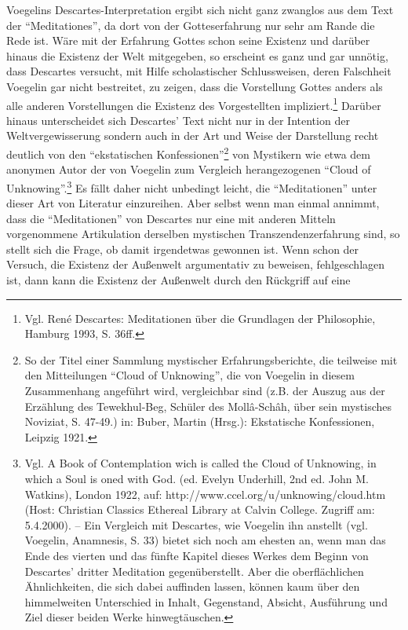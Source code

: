 Voegelins Descartes-Interpretation ergibt sich nicht ganz zwanglos aus dem
Text der "`Meditationes"', da dort von der Gotteserfahrung nur sehr am Rande
die Rede ist. Wäre mit der Erfahrung Gottes schon seine Existenz und darüber
hinaus die Existenz der Welt mitgegeben, so erscheint es ganz und gar unnötig,
dass Descartes versucht, mit Hilfe scholastischer Schlussweisen, deren
Falschheit Voegelin gar nicht bestreitet, zu zeigen, dass die Vorstellung
Gottes anders als alle anderen Vorstellungen die Existenz des Vorgestellten
impliziert.\footnote{Vgl. René Descartes: Meditationen über die Grundlagen der
  Philosophie, Hamburg 1993, S. 36ff.} Darüber hinaus unterscheidet sich
Descartes' Text nicht nur in der Intention der Weltvergewisserung sondern auch
in der Art und Weise der Darstellung recht deutlich von den "`ekstatischen
Konfessionen"'\footnote{So der Titel einer Sammlung mystischer
  Erfahrungsberichte, die teilweise mit den Mitteilungen "`Cloud of
  Unknowing"', die von Voegelin in diesem Zusammenhang angeführt wird,
  vergleichbar sind (z.B. der Auszug aus der Erzählung des Tewekhul-Beg,
  Schüler des Moll\^a-Sch\^ah, über sein mystisches Noviziat, S. 47-49.) in:
  Buber, Martin (Hrsg.): Ekstatische Konfessionen, Leipzig 1921.} von
Mystikern wie etwa dem anonymen Autor der von Voegelin zum Vergleich
herangezogenen "`Cloud of Unknowing"'.\footnote{Vgl. A Book of Contemplation
  wich is called the Cloud of Unknowing, in which a Soul is oned with God.
  (ed. Evelyn Underhill, 2nd ed.  John M. Watkins), London 1922, auf:
  http://www.ccel.org/u/unknowing/cloud.htm (Host: Christian Classics Ethereal
  Library at Calvin College. Zugriff am: 5.4.2000). -- Ein Vergleich mit
  Descartes, wie Voegelin ihn anstellt (vgl. Voegelin, Anamnesis, S. 33)
  bietet sich noch am ehesten an, wenn man das Ende des vierten und das fünfte
  Kapitel dieses Werkes dem Beginn von Descartes' dritter Meditation
  gegenüberstellt. Aber die oberflächlichen Ähnlichkeiten, die sich dabei
  auf\/finden lassen, können kaum über den himmelweiten Unterschied in Inhalt,
  Gegenstand, Absicht, Ausführung und Ziel dieser beiden Werke
  hinwegtäuschen.} Es fällt daher nicht unbedingt leicht, die "`Meditationen"'
unter dieser Art von Literatur einzureihen. Aber selbst wenn man einmal
annimmt, dass die "`Meditationen"' von Descartes nur eine mit anderen Mitteln
vorgenommene Artikulation derselben mystischen Transzendenzerfahrung sind, so
stellt sich die Frage, ob damit irgendetwas gewonnen ist. Wenn schon der
Versuch, die Existenz der Außenwelt argumentativ zu beweisen, fehlgeschlagen
ist, dann kann die Existenz der Außenwelt durch den Rückgriff auf eine
